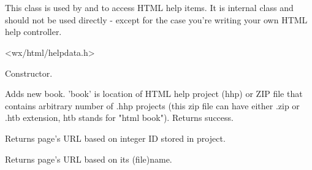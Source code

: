 %
%

\section{}\label{wxhtmlhelpdata}

This class is used by 
and  to access HTML help items.
It is internal class and should not be used directly - except for the case 
you're writing your own HTML help controller.





<wx/html/helpdata.h>



\label{wxhtmlhelpdatawxhtmlhelpdata}


Constructor.


\label{wxhtmlhelpdataaddbook}


Adds new book. 'book' is location of HTML help project (hhp) or ZIP file
that contains arbitrary number of .hhp projects (this zip file can have
either .zip or .htb extension, htb stands for "html book").
Returns success.


\label{wxhtmlhelpdatafindpagebyid}


Returns page's URL based on integer ID stored in project.


\label{wxhtmlhelpdatafindpagebyname}


Returns page's URL based on its (file)name.


\label{wxhtmlhelpdatagetbookrecarray}



